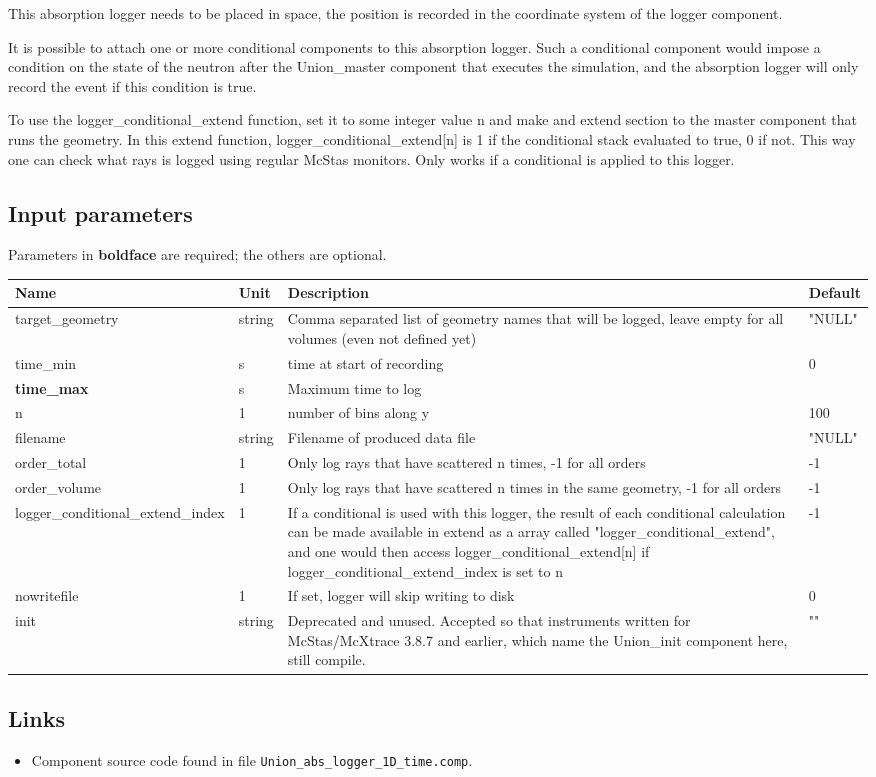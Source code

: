 This absorption logger needs to be placed in space, the position is recorded in the coordinate system of the logger component.

It is possible to attach one or more conditional components to this absorption logger. Such a conditional component would impose a condition on the state of the neutron after the Union\_master component that executes the simulation, and the absorption logger will only record the event if this condition is true.

To use the logger\_conditional\_extend function, set it to some integer value n and make and extend section to the master component that runs the geometry. In this extend function, logger\_conditional\_extend[n] is 1 if the conditional stack evaluated to true, 0 if not. This way one can check what rays is logged using regular McStas monitors. Only works if a conditional is applied to this logger.

\subsection*{Input parameters}
Parameters in \textbf{boldface} are required; the others are optional.

\begin{longtable}{p{}p{}p{}p{}}
\toprule
\textbf{Name} & \textbf{Unit} & \textbf{Description} & \textbf{Default} \\
\midrule
\endhead
target\_geometry & string & Comma separated list of geometry names that will be logged, leave empty for all volumes (even not defined yet) & "NULL" \\
time\_min & s & time at start of recording & 0 \\
\textbf{time\_max} & s & Maximum time to log &  \\
n & 1 & number of bins along y & 100 \\
filename & string & Filename of produced data file & "NULL" \\
order\_total & 1 & Only log rays that have scattered n times, -1 for all orders & -1 \\
order\_volume & 1 & Only log rays that have scattered n times in the same geometry, -1 for all orders & -1 \\
logger\_conditional\_extend\_index & 1 & If a conditional is used with this logger, the result of each conditional calculation can be made available in extend as a array called "logger\_conditional\_extend", and one would then access logger\_conditional\_extend[n] if logger\_conditional\_extend\_index is set to n & -1 \\
nowritefile & 1 & If set, logger will skip writing to disk & 0 \\
init & string & Deprecated and unused. Accepted so that instruments written for McStas/McXtrace 3.8.7 and earlier, which name the Union\_init component here, still compile. & "" \\
\bottomrule
\end{longtable}

\subsection*{Links}
\begin{itemize}
  \item Component source code found in file \texttt{Union\_abs\_logger\_1D\_time.comp}.
\end{itemize}

